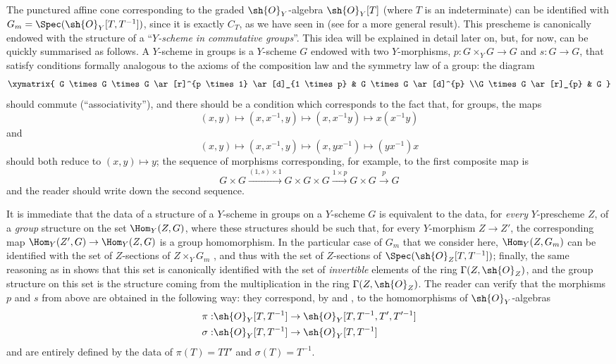 \begin{remark}[8.3.9]
\label{II.8.3.9}
The punctured affine cone corresponding to the graded $\sh{O}_Y$-algebra $\sh{O}_Y[T]$ (where $T$ is an indeterminate) can be identified with $G_m=\Spec(\sh{O}_Y[T,T^{-1}])$, since it is exactly $C_T$, as we have seen in  (see  for a more general result).
This prescheme is canonically endowed with the structure of a ``\emph{$Y$-scheme in commutative groups}''.
This idea will be explained in detail later on, but, for now, can be quickly summarised as follows.
A $Y$-scheme in groups is a $Y$-scheme $G$ endowed with two $Y$-morphisms, $p:G\times_Y G\to G$ and $s:G\to G$, that satisfy conditions formally analogous to the axioms of the composition law and the symmetry law of a group: the diagram
\[
  \xymatrix{
    G \times G \times G
      \ar[r]^{p \times 1}
      \ar[d]_{1 \times p}
  & G \times G
      \ar[d]^{p}
  \\G \times G
      \ar[r]_{p}
  & G
  }
\]
should commute (``associativity''), and there should be a condition which corresponds to the fact that, for groups, the maps
\[
  (x,y)
  \mapsto
  (x,x^{-1},y)
  \mapsto
  (x,x^{-1}y)
  \mapsto
  x(x^{-1}y)
\]
and
\[
  (x,y)
  \mapsto
  (x,x^{-1},y)
  \mapsto
  (x,yx^{-1})
  \mapsto
  (yx^{-1})x
\]
should both reduce to $(x,y)\mapsto y$;
the sequence of morphisms corresponding, for example, to the first composite map is
\[
  G \times G
  \xrightarrow{(1,s) \times 1}
  G \times G \times G
  \xrightarrow{1 \times p}
  G\times G
  \xrightarrow{p}
  G
\]
and the reader should write down the second sequence.

It is immediate  that the data of a structure of a $Y$-scheme in groups on a $Y$-scheme $G$ is equivalent to the data, for \emph{every} $Y$-prescheme $Z$, of a \emph{group} structure on the set $\Hom_Y(Z,G)$, where these structures should be such that, for every $Y$-morphism $Z\to Z'$, the corresponding map $\Hom_Y(Z',G)\to\Hom_Y(Z,G)$ is a group homomorphism.
In the particular case of $G_m$ that we consider here, $\Hom_Y(Z,G_m)$ can be identified with the set of $Z$-sections of $Z\times_Y G_m$ , and thus with the set of $Z$-sections of $\Spec(\sh{O}_Z[T,T^{-1}])$;
finally, the same reasoning as in  shows that this set is canonically identified with the set of \emph{invertible} elements of the ring $\Gamma(Z,\sh{O}_Z)$, and the group structure on this set is the structure coming from the multiplication in the ring $\Gamma(Z,\sh{O}_Z)$.
The reader can verify that the morphisms $p$ and $s$ from above are obtained in the following way: they correspond, by  and , to the homomorphisms of $\sh{O}_Y$-algebras
\begin{align*}
  \pi: &\sh{O}_Y[T,T^{-1}] \to \sh{O}_Y[T,T^{-1},T',T'^{-1}]
\\\sigma: &\sh{O}_Y[T,T^{-1}] \to \sh{O}_Y[T,T^{-1}]
\end{align*}
and are entirely defined by the data of $\pi(T)=TT'$ and $\sigma(T)=T^{-1}$.


\end{remark}
